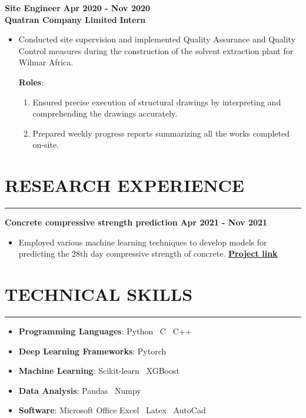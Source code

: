\documentclass[letterpaper, 12pt]{article}
\newcommand{\cvsection}[1]{
	
	\section*{#1}	
	\rule[20pt]{\linewidth}{0.5pt} %

}
\newcommand{\verticalSpace}{4pt}
\newcommand{\itemizeMargin}{11pt}
\begin{document}
	\textbf{Site Engineer} \hfill \textbf{Apr 2020 - Nov 2020} \\ [\verticalSpace]
	\textbf{Quatran Company Limited} \hfill \textbf{Intern}
	
	\begin{itemize}[leftmargin=\itemizeMargin]
		
		\item Conducted site supervision and implemented Quality Assurance and Quality Control measures during the construction of the solvent extraction plant for Wilmar Africa.
		
		\textbf{Roles}:
		
		\begin{enumerate}[label=\roman*.,leftmargin=10pt]
			
			\item Ensured precise execution of structural drawings by interpreting and comprehending the drawings accurately.
			\item Prepared weekly progress reports summarizing all the works completed on-site.
			
		\end{enumerate}

	\end{itemize}
	
	
	\cvsection{RESEARCH EXPERIENCE}
	
	\textbf{Concrete compressive strength prediction} \hfill \textbf{Apr 2021 - Nov 2021}
	
	\begin{itemize}[leftmargin=\itemizeMargin]
		
		\item Employed various machine learning techniques to develop models for predicting the 28th day compressive strength of concrete. \href{https://www.github.com/patrickboateng/strength-prediction}{\underline{\textbf{Project link}}}
		
	\end{itemize}
	
	
	\cvsection{TECHNICAL SKILLS}
	
	\begin{itemize}[leftmargin=\itemizeMargin, before=\vspace{-\baselineskip}]
		
		\item \textbf{Programming Languages}: Python \vrule \, C \vrule \, C++
		\item \textbf{Deep Learning Frameworks}: Pytorch
		\item \textbf{Machine Learning}: Scikit-learn \vrule \, XGBoost
		\item \textbf{Data Analysis}: Pandas \vrule \, Numpy
		\item \textbf{Software}: Microsoft Office Excel \vrule \, Latex \vrule \, AutoCad
		
	\end{itemize}
	
\end{document}
